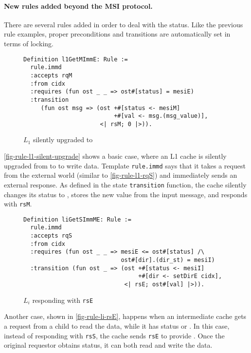 \documentclass[sigplan,10pt,review,anonymous,screen]{acmart}\settopmatter{printfolios=true,printccs=false,printacmref=false}
\def\slstinline{\lstinline[basicstyle=\ttfamily\small]}
\begin{document}
\paragraph{New rules added beyond the MSI protocol.}
There are several rules added in order to deal with the \stE{} status.
Like the previous rule examples, proper preconditions and transitions are automatically set in terms of locking.

\begin{figure}[h]
  \centering
\begin{lstlisting}
Definition l1GetMImmE: Rule :=
  rule.immd
  :accepts rqM
  :from cidx
  :requires (fun ost _ _ => ost#[status] = mesiE)
  :transition
     (fun ost msg => (ost +#[status <- mesiM]
                          +#[val <- msg.(msg_value)],
                      <| rsM; 0 |>)).
\end{lstlisting}
  \caption{$L_1$ silently upgraded to \stM{}}
  \label{fig-rule-l1-silent-upgrade}
\end{figure}

\autoref{fig-rule-l1-silent-upgrade} shows a basic case, where an L1 cache is silently upgraded from \stE{} to \stM{} to write data.
Template \slstinline{rule.immd} says that it takes a request from the external world (similar to \autoref{fig-rule-l1-rqS}) and immediately sends an external response.
As defined in the state \slstinline{transition} function, the cache silently changes its status to \stM{}, stores the new value from the input message, and responds with \slstinline{rsM}.

\begin{figure}[h]
  \centering
\begin{lstlisting}
Definition liGetSImmME: Rule :=
  rule.immd
  :accepts rqS
  :from cidx
  :requires (fun ost _ _ => mesiE <= ost#[status] /\
                            ost#[dir].(dir_st) = mesiI)
  :transition (fun ost _ => (ost +#[status <- mesiI]
                                 +#[dir <- setDirE cidx],
                             <| rsE; ost#[val] |>)).
\end{lstlisting}
  \caption{$L_i$ responding with \slstinline{rsE}}
  \label{fig-rule-li-rsE}
\end{figure}

Another case, shown in \autoref{fig-rule-li-rsE}, happens when an intermediate cache gets a request from a child to read the data, while it has status \stE{} or \stM{}.
In this case, instead of responding with \slstinline{rsS}, the cache sends \slstinline{rsE} to provide \stE{}.
Once the original requestor obtains \stE{} status, it can both read and write the data.
\end{document}
